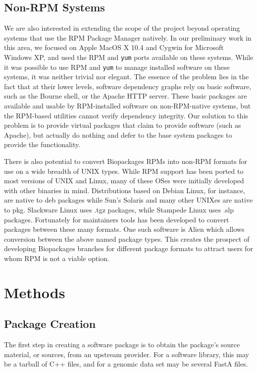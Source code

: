 \subsection{Non-RPM Systems}

We are also interested in extending the scope of the project beyond operating
systems that use the RPM Package Manager natively.  In our preliminary work in
this area, we focused on Apple MacOS X 10.4 and Cygwin for Microsoft Windows
XP, and used the RPM and \texttt{yum} ports available on these systems.  While it was
possible to use RPM and \texttt{yum} to manage installed software on these systems, it
was neither trivial nor elegant.  The essence of the problem lies in the fact
that at their lower levels, software dependency graphs rely on basic software,
such as the Bourne shell, or the Apache HTTP server.  These basic packages are
available and usable by RPM-installed software on non-RPM-native systems, but
the RPM-based utilities cannot verify dependency integrity.  Our solution to
this problem is to provide virtual packages that claim to provide software
(such as Apache), but actually do nothing and defer to the base system packages
to provide the functionality.

There is also potential to convert Biopackages RPMs into non-RPM formats for
use on a wide breadth of UNIX types. While RPM support has been ported to most
versions of UNIX and Linux, many of these OSes were initially
developed with other binaries in mind. Distributions based on Debian Linux,
for instance, are native to deb packages while Sun's Solaris and many other
UNIXes are native to pkg. Slackware Linux uses .tgz packages, while
Stampede Linux uses .slp packages. Fortunately for maintainers tools has
been developed to convert packages between these many formats. One such
software is Alien which allows conversion between the above named package
types. This creates the prospect of developing Biopackages branches for
different package formats to attract users for whom RPM is not a viable option.

\section{Methods}

\subsection{Package Creation}

The first step in creating a software package is to obtain the package's source
material, or sources, from an upstream provider.  For a software library, this
may be a tarball of C++ files, and for a genomic data set may be several FastA
files.

